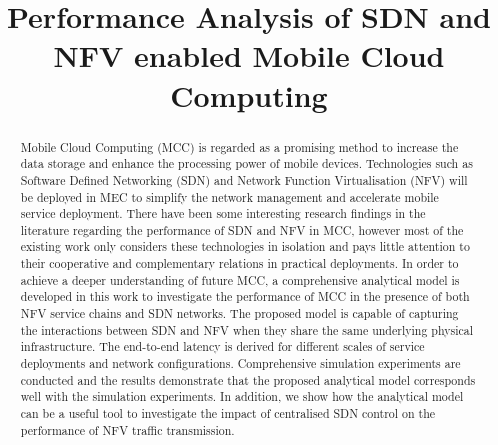 \documentclass[conference]{IEEEtran}
\begin{document}
\title{Performance Analysis of SDN and NFV enabled Mobile Cloud Computing}

\author{
}
 
\maketitle

\begin{abstract}
Mobile Cloud Computing (MCC) is regarded as a promising method to increase the data storage and enhance the processing power of mobile devices. Technologies such as Software Defined Networking (SDN) and Network Function Virtualisation (NFV) will be deployed in MEC to simplify the network management and accelerate mobile service deployment. There have been some interesting research findings in the literature regarding the performance of SDN and NFV in MCC, however most of the existing work only considers these technologies in isolation and pays little attention to their cooperative and complementary relations in practical deployments. In order to achieve a deeper understanding of future MCC, a comprehensive analytical model is developed in this work to investigate the performance of MCC in the presence of both NFV service chains and SDN networks. The proposed model is capable of capturing the interactions between SDN and NFV when they share the same underlying physical infrastructure. The end-to-end latency is derived for different scales of service deployments and network configurations. Comprehensive simulation experiments are conducted and the results demonstrate that the proposed analytical model corresponds well with the simulation experiments. In addition, we show how the analytical model can be a useful tool to investigate the impact of centralised SDN control on the performance of NFV traffic transmission. 
\end{abstract}













\end{document}
